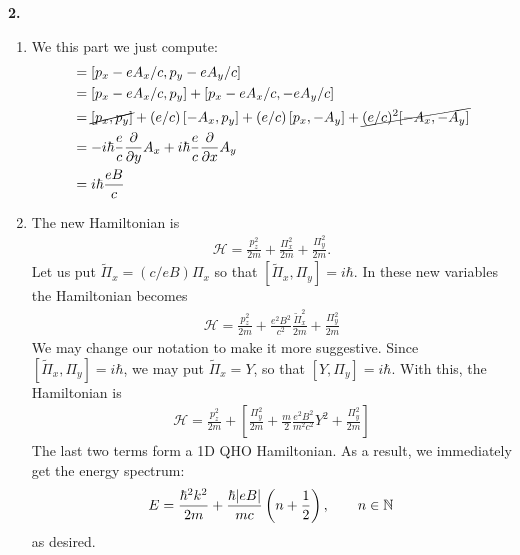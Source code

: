\documentclass{article}
\theoremstyle{definition}
\newcommand{\p}{\partial}
\newcommand{\ham}{\mathcal{H}}
\newcommand{\f}[2]{\frac{#1}{#2}}
\newcommand{\lp}{\left(}
\newcommand{\rp}{\right)}
\newcommand{\lb}{\left[}
\newcommand{\rb}{\right]}
\begin{document}
\noindent \textbf{2. }
\begin{enumerate}[label=(\alph*)]
	\item We this part we just compute:
	\begin{align*}
	[\Pi_x, \Pi_y] 
	&= \lb p_x - eA_x/c, p_y - eA_y/c \rb \\
	&= \lb p_x - eA_x/c, p_y \rb + \lb p_x - eA_x/c, - eA_y/c \rb  \\
	&= \cancel{\lb p_x,p_y \rb}  + (e/c)\lb - A_x, p_y  \rb + (e/c)\lb p_x, -A_y \rb + \cancel{(e/c)^2[-A_x,-A_y]}\\
	&= -i\hbar \f{e}{c}\f{\p}{\p y}A_x + i\hbar \f{e}{c} \f{\p }{ \p x} A_y \\
	&= i\hbar \f{eB}{c}
	\end{align*}
	
	\item The new Hamiltonian is 
	\begin{align*}
	\ham = \f{p_z^2}{2m} + \f{\Pi_x^2}{2m} + \f{\Pi_y^2}{2m}.
	\end{align*}
	Let us put $\widetilde{\Pi}_x = (c/eB) \Pi_x$  so that $[\widetilde{\Pi}_x, {\Pi}_y]= i\hbar$. In these new variables the Hamiltonian becomes
	\begin{align*}
	\ham = \f{p_z^2}{2m} + \f{e^2 B^2}{c^2}\f{\widetilde{\Pi}_x^2}{2m} + \f{{\Pi}_y^2}{2m}
	\end{align*}
	We may change our notation to make it more suggestive. Since $[\widetilde{\Pi}_x,\Pi_y] = i\hbar$, we may put $\widetilde{\Pi}_x = Y$, so that $[Y,\Pi_y] = i\hbar$. With this, the Hamiltonian is 
	\begin{align*}
	\ham = \f{p_z^2}{2m} + \lb \f{\Pi_y^2}{2m} + \f{m}{2} \f{e^2B^2}{m^2c^2}Y^2 + \f{\Pi_y^2}{2m} \rb
	\end{align*}
	The last two terms form a 1D QHO Hamiltonian. As a result, we immediately get the energy spectrum:
	\begin{align*}
	E = \f{\hbar^2 k^2}{2m} + \f{\hbar \abs{eB}}{mc}\lp n + \f{1}{2}\rp, \quad\quad n\in \mathbb{N}
	\end{align*}
	as desired. 
\end{enumerate}
\end{document}
